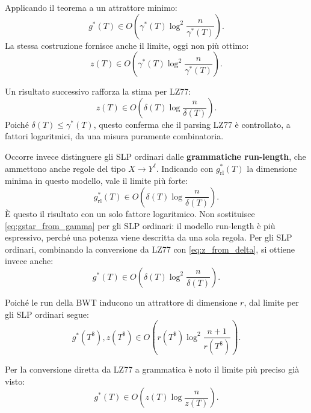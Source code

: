 \documentclass{article}
\theoremstyle{definition}
\numberwithin{equation}{section}
\begin{document}
Applicando il teorema a un attrattore minimo:
\begin{equation}\label{eq:gstar_from_gamma}
    g^*(T)
    \in
    O\left(
    \gamma^*(T)
    \log^2\frac{n}{\gamma^*(T)}
    \right).
\end{equation}
La stessa costruzione fornisce anche il limite, oggi non più ottimo:
\begin{equation}\label{eq:z_from_gamma}
    z(T)
    \in
    O\left(
    \gamma^*(T)
    \log^2\frac{n}{\gamma^*(T)}
    \right).
\end{equation}

Un risultato successivo rafforza la stima per LZ77:
\begin{equation}\label{eq:z_from_delta}
    z(T)
    \in
    O\left(
    \delta(T)
    \log\frac{n}{\delta(T)}
    \right).
\end{equation}
Poiché $\delta(T)\leq\gamma^*(T)$, questo conferma che il parsing LZ77 è
controllato, a fattori logaritmici, da una misura puramente combinatoria.

Occorre invece distinguere gli SLP ordinari dalle
\textbf{grammatiche run-length}, che ammettono anche regole del tipo
$X\to Y^\ell$. Indicando con $g^*_{\mathrm{rl}}(T)$ la dimensione minima in
questo modello, vale il limite più forte:
\begin{equation}\label{eq:run_length_grammar_from_delta}
    g^*_{\mathrm{rl}}(T)
    \in
    O\left(
    \delta(T)
    \log\frac{n}{\delta(T)}
    \right).
\end{equation}
È questo il risultato con un solo fattore logaritmico. Non sostituisce
\eqref{eq:gstar_from_gamma} per gli SLP ordinari: il modello run-length è più
espressivo, perché una potenza viene descritta da una sola regola. Per gli SLP
ordinari, combinando la conversione da LZ77 con
\eqref{eq:z_from_delta}, si ottiene invece anche:
\[
    g^*(T)
    \in
    O\left(
    \delta(T)
    \log^2\frac{n}{\delta(T)}
    \right).
\]

Poiché le run della BWT inducono un attrattore di dimensione $r$, dal limite
per gli SLP ordinari segue:
\begin{equation}\label{eq:grammar_lz_from_runs}
    g^*(T^\$),z(T^\$)
    \in
    O\left(
    r(T^\$)
    \log^2\frac{n+1}{r(T^\$)}
    \right).
\end{equation}

Per la conversione diretta da LZ77 a grammatica è noto il limite più preciso
già visto:
\[
    g^*(T)
    \in
    O\left(
    z(T)\log\frac{n}{z(T)}
    \right).
\]
\end{document}
